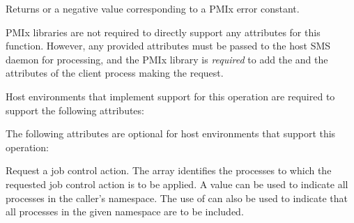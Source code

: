 \begin{arglist}
\end{arglist}

Returns  or a negative value corresponding to a PMIx error constant.

\reqattrstart
\ac{PMIx} libraries are not required to directly support any attributes for this function. However, any provided attributes must be passed to the host \ac{SMS} daemon for processing, and the \ac{PMIx} library is \textit{required} to add the  and the  attributes of the client process making the request.

Host environments that implement support for this operation are required to support the following attributes:


\reqattrend

\optattrstart
The following attributes are optional for host environments that support this operation:


\optattrend

\descr

Request a job control action.
The  array identifies the processes to which the requested job control action is to be applied.
A  value can be used to indicate all processes in the caller's namespace.
The use of  can also be used to indicate that all processes in the given namespace are to be included.

